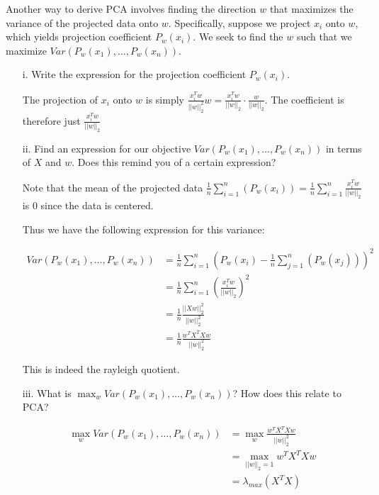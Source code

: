 \begin{Parts}
\Part
Another way to derive PCA involves finding the direction $w$ that maximizes the variance of the projected data onto $w$. Specifically, suppose we project $x_i$ onto $w$, which yields projection coefficient $P_{w}(x_i)$. We seek to find the $w$ such that we maximize $Var(P_{w}(x_1), \ldots, P_{w}(x_n))$.

\begin{enumerate}
\item[i.] Write the expression for the projection coefficient $P_{w}(x_i)$.

\begin{solution}
	The projection of $x_i$ onto $w$ is simply $\frac{x_i^Tw}{||w||_2^2} w = \frac{x_i^Tw}{||w||_2} \cdot \frac{w}{||w||_2}$. The coefficient is therefore just $\frac{x_i^Tw}{||w||_2}$
\end{solution}

\item[ii.] Find an expression for our objective $Var(P_{w}(x_1), \ldots, P_{w}(x_n))$ in terms of $X$ and $w$. Does this remind you of a certain expression?

\begin{solution}
	Note that the mean of the projected data $\frac{1}{n} \sum_{i=1}^n (P_{w}(x_i)) = \frac{1}{n} \sum_{i=1}^n \frac{x_i^Tw}{||w||_2}$ is $0$ since the data is centered.

	Thus we have the following expression for this variance:

	\begin{align*}
	Var(P_{w}(x_1), \ldots, P_{w}(x_n)) &= \frac{1}{n} \sum_{i=1}^n (P_{w}(x_i) - \frac{1}{n} \sum_{j=1}^n (P_{w}(x_j)))^2 \\
	&= \frac{1}{n} \sum_{i=1}^n (\frac{x_i^Tw}{||w||_2})^2 \\
	&= \frac{1}{n} \frac{||Xw||_2^2}{||w||_2^2} \\
	&= \frac{1}{n} \frac{w^TX^TXw}{||w||_2^2}
	\end{align*}

	This is indeed the rayleigh quotient.
\end{solution}

\item[iii.] What is $\max_{w} Var(P_{w}(x_1), \ldots, P_{w}(x_n))$? How does this relate to PCA?

\begin{solution}
	\begin{align*}
	\max_{w} Var(P_{w}(x_1), \ldots, P_{w}(x_n)) &= \max_{w} \frac{w^TX^TXw}{||w||_2^2} \\
	&= \max_{||w||_2 = 1} w^TX^TXw \\
	&= \lambda_{max}(X^TX)
	\end{align*}


\end{solution}
\end{enumerate}
\end{Parts}
